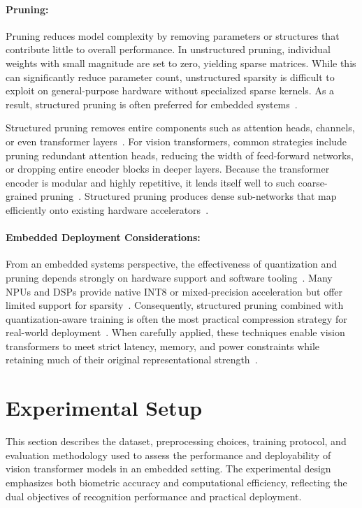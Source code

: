 \documentclass[runningheads,a4paper]{llncs}
\begin{document}
\paragraph{Pruning:}
Pruning reduces model complexity by removing parameters or structures that contribute little to overall performance. In unstructured pruning, individual weights with small magnitude are set to zero, yielding sparse matrices. While this can significantly reduce parameter count, unstructured sparsity is difficult to exploit on general-purpose hardware without specialized sparse kernels. As a result, structured pruning is often preferred for embedded systems~\cite{Jiang2023SingleShot}.

Structured pruning removes entire components such as attention heads, channels, or even transformer layers~\cite{Roth2024ResourceEff}. For vision transformers, common strategies include pruning redundant attention heads, reducing the width of feed-forward networks, or dropping entire encoder blocks in deeper layers. Because the transformer encoder is modular and highly repetitive, it lends itself well to such coarse-grained pruning~\cite{Park2023PTPrune}. Structured pruning produces dense sub-networks that map efficiently onto existing hardware accelerators~\cite{Roth2024ResourceEff}.

\paragraph{Embedded Deployment Considerations:}
From an embedded systems perspective, the effectiveness of quantization and pruning depends strongly on hardware support and software tooling~\cite{Ngo2025EdgeInference}. Many NPUs and DSPs provide native INT8 or mixed-precision acceleration but offer limited support for sparsity~\cite{Roth2024ResourceEff}. Consequently, structured pruning combined with quantization-aware training is often the most practical compression strategy for real-world deployment~\cite{liu2025modelcompression,Jiang2023SingleShot}. When carefully applied, these techniques enable vision transformers to meet strict latency, memory, and power constraints while retaining much of their original representational strength~\cite{Li2023IViT}.

\section{Experimental Setup}\label{sec:experimental}
This section describes the dataset, preprocessing choices, training protocol, and evaluation methodology used to assess the performance and deployability of vision transformer models in an embedded setting. The experimental design emphasizes both biometric accuracy and computational efficiency, reflecting the dual objectives of recognition performance and practical deployment.
\end{document}

